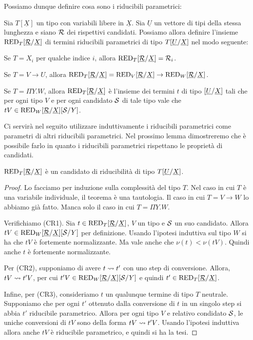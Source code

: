 \documentclass[]{marticle}
\begin{document}
Possiamo dunque definire cosa sono i riducibili parametrici:
\newcommand{\subrx}{\sub{\underline{\can{R}}}{\underline{X}}}
\begin{block} [Definizione]
    Sia $T[\underline{X}]$ un tipo con variabili libere in $\underline{X}$. Sia
    $\underline{U}$ un vettore di tipi della stessa lunghezza e siano $\mathcal{R}$
    dei rispettivi candidati. Possiamo allora definire l'insieme
    $\red{T}\subrx$ di termini riducibili parametrici di tipo
    $T[\underline{U}/\underline{X}]$ nel modo seguente:
    \begin{nlist} [1]
        \item  Se $T=X_i$ per qualche indice $i$, allora
            $\red{T}\subrx=\can{R}_i$.
        \item Se $T=V\rightarrow U$, allora $\red{T}\subrx = \red{V}\subrx
            \rightarrow \red{W}\subrx$.
        \item Se $T=\Pi Y.W$, allora $\red{T}\subrx$ \`e l'insieme dei termini
            $t$ di tipo $[\underline{U}/\underline{X}]$ tali che per ogni
            tipo $V$ e per ogni candidato $\mathcal{S}$ di tale tipo vale che $tV
            \in \red{W}\subrx\sub{\can{S}}{Y}$.
    \end{nlist}
\end{block}

Ci servir\`a nel seguito utilizzare induttivamente i riducibili parametrici come
parametri di altri riducibili parametrici. Nel prossimo lemma dimostreremo che
\`e possibile farlo in quanto i riducibili parametrici rispettano le propriet\`a
di candidati.
\begin{block} [Lemma]
    $\red{T}\subrx$ \`e un candidato di riducibilit\`a di tipo
    $T[\underline{U}/\underline{X}]$.
\end{block}
\begin{proof}
    Lo facciamo per induzione sulla complessit\`a del tipo $T$. Nel caso in cui
    $T$ \`e una variabile individuale, il teorema \`e una tautologia. Il caso in
    cui $T=V\rightarrow W$ lo abbiamo gi\`a fatto. Manca solo il caso in cui
    $T=\Pi Y.W$. 

    Verifichiamo (CR1). Sia $t\in \red{T}\subrx$, $V$ un tipo e $\mathcal{S}$ un suo
    candidato. Allora $tV \in \red{W}\subrx\sub{\can{S}}{Y}$ per definizione.
    Usando l'ipotesi induttiva sul tipo $W$ si ha che $tV$ \`e fortemente
    normalizzante. Ma vale anche che $\nu(t)<\nu(tV)$. Quindi anche $t$ \`e
    fortemente normalizzante. 

    Per (CR2), supponiamo di avere $t\rightsquigarrow t'$ con uno step di conversione.
    Allora, $tV\rightsquigarrow t'V$, per cui $t'V \in \red{W}\subrx\sub{\can{S}}{Y}$ e
    quindi $t'\in \red{T}\subrx$.

    Infine, per (CR3), consideriamo $t$ un qualunque termine di tipo $T$
    neutrale. Supponiamo che per ogni $t'$ ottenuto dalla conversione di $t$ in
    un singolo step si abbia $t'$ riducibile parametrico. Allora per ogni tipo
    $V$ e relativo condidato $\mathcal{S}$, le uniche conversioni di $tV$ sono della
    forma $tV\rightsquigarrow t'V$. Usando l'ipotesi induttiva allora anche $tV$ \`e
    riducibile parametrico, e quindi si ha la tesi.
\end{proof}
\end{document}
